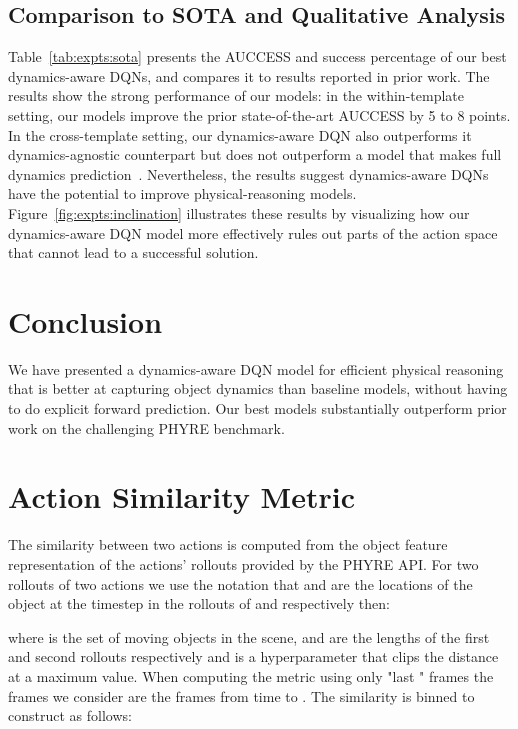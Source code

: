 \documentclass{article}
\begin{document}
\subsection{Comparison to SOTA and Qualitative Analysis}
Table~\ref{tab:expts:sota} presents the AUCCESS and success percentage of our best dynamics-aware DQNs, and compares it to results reported in prior work.
The results show the strong performance of our models: in the within-template setting, our models improve the prior state-of-the-art AUCCESS by 5 to 8 points.
In the cross-template setting, our dynamics-aware DQN also outperforms it dynamics-agnostic counterpart but does not outperform a model that makes full dynamics prediction~\cite{girdhar2020forward}.
Nevertheless, the results suggest dynamics-aware DQNs have the potential to improve physical-reasoning models.
Figure~\ref{fig:expts:inclination} illustrates these results by visualizing how our dynamics-aware DQN model more effectively rules out parts of the action space that cannot lead to a successful solution.
 \section{Conclusion}
We have presented a dynamics-aware DQN model for efficient physical reasoning that is better at capturing object dynamics than baseline models, without having to do explicit forward prediction. Our best models substantially outperform prior work on the challenging PHYRE benchmark.
 






\clearpage
\appendix
\section{Action Similarity Metric}
\label{apndx:metric}
The similarity between two actions is computed from the object feature representation of the actions' rollouts provided by the PHYRE API. For two rollouts of two actions  we use the notation that  and  are the locations of the object  at the timestep  in the rollouts of  and  respectively then:





where  is the set of moving objects in the scene,  and  are the lengths of the first and second rollouts respectively and  is a hyperparameter that clips the distance at a maximum value.
When computing the metric using only "last " frames the frames we consider are the frames from time  to .
The similarity  is binned to construct  as follows:
\end{document}
